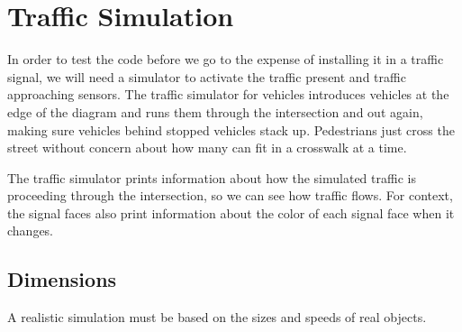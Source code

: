 \documentclass[letterpaper,twoside]{article}
\begin{document}
\section{Traffic Simulation}

In order to test the code before we go to the expense of installing
it in a traffic signal, we will need a simulator to activate the
traffic present and traffic approaching sensors.  The traffic simulator
for vehicles introduces vehicles at the edge of the diagram and
runs them through the intersection and out again, making sure vehicles
behind stopped vehicles stack up.  Pedestrians just cross the street
without concern about how many can fit in a crosswalk at a time.

The traffic simulator prints information about how the simulated
traffic is proceeding through the intersection, so we can see how
traffic flows.  For context, the signal faces also print information
about the color of each signal face when it changes.

\subsection{Dimensions}

A realistic simulation must be based on the sizes and speeds of real objects.
\end{document}
